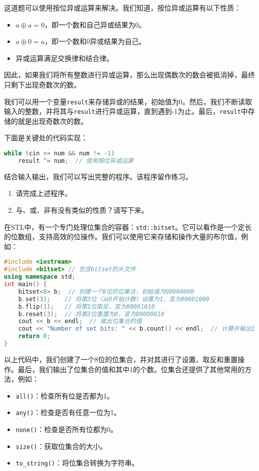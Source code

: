 \documentclass[../main.tex]{subfiles}
\begin{document}
\begin{answer}
    这道题可以使用按位异或运算来解决。我们知道，按位异或运算有以下性质：
    \begin{itemize}
        \item $a \oplus a = 0$，即一个数和自己异或结果为0。
        \item $a \oplus 0 = a$，即一个数和0异或结果为自己。
        \item 异或运算满足交换律和结合律。
    \end{itemize}
    因此，如果我们将所有整数进行异或运算，那么出现偶数次的数会被抵消掉，最终只剩下出现奇数次的数。

    我们可以用一个变量\texttt{result}来存储异或的结果，初始值为0。然后，我们不断读取输入的整数，并将其与\texttt{result}进行异或运算，直到遇到-1为止。最后，\texttt{result}中存储的就是出现奇数次的数。

    下面是关键处的代码实现：
\begin{lstlisting}[language=C++]
while (cin >> num && num != -1)
    result ^= num;  // 使用按位异或运算
\end{lstlisting}
    结合输入输出，我们可以写出完整的程序。该程序留作练习。
\end{answer}

\begin{exercise}
    \begin{enumerate}
        \item 请完成上述程序。
        \item 与、或、非有没有类似的性质？请写下来。
    \end{enumerate}
\end{exercise}

在STL中，有一个专门处理位集合的容器：\texttt{std::bitset}。它可以看作是一个定长的位数组，支持高效的位操作。我们可以使用它来存储和操作大量的布尔值，例如：
\begin{lstlisting}[language=C++]
#include <iostream>
#include <bitset> // 包含bitset的头文件
using namespace std;
int main() {
    bitset<8> b;  // 创建一个8位的位集合，初始值为00000000
    b.set(3);    // 将第3位（从0开始计数）设置为1，变为00001000
    b.flip(1);   // 将第1位取反，变为00001010
    b.reset(3);  // 将第3位重置为0，变为00000010
    cout << b << endl;  // 输出位集合的值
    cout << "Number of set bits: " << b.count() << endl;  // 计算并输出1的个数
    return 0;
}
\end{lstlisting}
以上代码中，我们创建了一个8位的位集合，并对其进行了设置、取反和重置操作。最后，我们输出了位集合的值和其中1的个数。位集合还提供了其他常用的方法，例如：
\begin{itemize}
  \item \texttt{all()}：检查所有位是否都为1。
  \item \texttt{any()}：检查是否有任意一位为1。
  \item \texttt{none()}：检查是否所有位都为0。
  \item \texttt{size()}：获取位集合的大小。
  \item \texttt{to\_string()}：将位集合转换为字符串。
\end{itemize}
\end{document}
